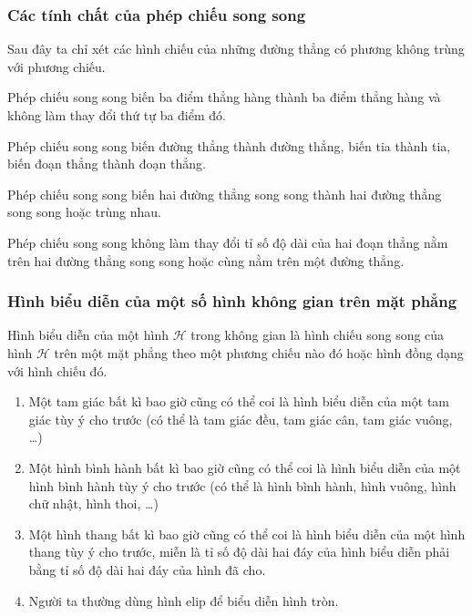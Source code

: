 \subsubsection{Các tính chất của phép chiếu song song}
Sau đây ta chỉ xét các hình chiếu của những đường thẳng có phương không trùng với phương chiếu.
\begin{tc}Phép chiếu song song biến ba điểm thẳng hàng thành ba điểm thẳng hàng và không làm thay đổi thứ tự ba điểm đó.
\end{tc}
\begin{tc}
	Phép chiếu song song biến đường thẳng thành đường thẳng, biến tia thành tia, biến đoạn thẳng thành đoạn thẳng.
\end{tc}
\begin{tc}
	Phép chiếu song song biến hai đường thẳng song song thành hai đường thẳng song song hoặc trùng nhau.
\end{tc}
\begin{tc}
	Phép chiếu song song không làm thay đổi tỉ số độ dài của hai đoạn thẳng nằm trên hai đường thẳng song song hoặc cùng nằm trên một đường thẳng.
\end{tc}
\subsubsection{Hình biểu diễn của một số hình không gian trên mặt phẳng}
Hình biểu diễn của một hình $\mathscr{H}$ trong không gian là hình chiếu song song của hình $\mathscr{H}$ trên một mặt phẳng theo một phương chiếu nào đó hoặc hình đồng dạng với hình chiếu đó.
\begin{enumerate}
	\item Một tam giác bất kì bao giờ cũng có thể coi là hình biểu diễn của một tam giác tùy ý cho trước (có thể là tam giác đều, tam giác cân, tam giác vuông, \ldots)
	\item Một hình bình hành bất kì bao giờ cũng có thể coi là hình biểu diễn của một hình bình hành tùy ý cho trước (có thể là hình bình hành, hình vuông, hình chữ nhật, hình thoi, \ldots)
	\item Một hình thang bất kì bao giờ cũng có thể coi là hình biểu diễn của một
	hình thang tùy ý cho trước, miễn là tỉ số độ dài hai đáy của hình biểu diễn
	phải bằng tỉ số độ dài hai đáy của hình đã cho.
	\item Người ta thường dùng hình elip để biểu diễn hình tròn.
\end{enumerate}
